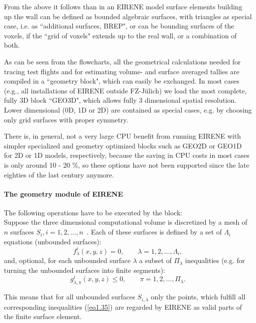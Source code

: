 From the above it follows than in an EIRENE model
surface elements building up the wall can be defined as bounded algebraic surfaces, with triangles as special case,
i.e. as ``additional surfaces, BREP", or can be bounding surfaces of the voxels, if the ``grid of voxels" extends up to the real wall, or a combination of both.

\medskip
As can be seen from the flowcharts, all the geometrical
calculations needed for tracing test flights and for estimating
volume- and surface averaged tallies are compiled in a ``geometry
block", which can easily be exchanged.
In most cases (e.g., all
installations of EIRENE outside FZ-J\"ulich) we load the most
complete, fully 3D block ``GEO3D", which allows fully 3 dimensional spatial
resolution. Lower dimensional (0D, 1D or 2D) are contained as special cases, e.g.
by choosing only grid surfaces with proper symmetry.


There is, in general, not a very large CPU benefit from
running EIRENE with simpler specialized and geometry optimized blocks such as GEO2D or GEO1D for 2D
or 1D models, respectively, because the saving in CPU costs in most
cases is only around 10 - 20 \%, so these options have not been supported since the late eighties of the last century anymore.

\paragraph{The geometry module of EIRENE\\}

The following operations have to be executed by the block:
\\Suppose the three dimensional
computational volume is discretized by a mesh of $n$ surfaces
\mbox{$S_i, i=1,2,...,n$ .} Each of these surfaces is defined by a
set of $\Lambda_i$ equations (unbounded surfaces):
\begin{equation}
f_{\lambda}^i (x,y,z)   =   0 { },    \quad \quad \lambda   =
1,2,..., \Lambda_i { }, \label{eq1.34}
\end{equation}
and, optional, for each unbounded surface $\lambda$  a subset of $ \Pi_{\lambda} $
inequalities (e.g. for turning the unbounded surfaces into finite segments):
\begin{equation}
g_{\lambda , \pi }^i (x,y,z)  \le   0 { },    \quad \quad \pi   =
1,2,..., \Pi_{\lambda} { }. \label{eq1.35}
\end{equation}

This means that for all unbounded surfaces $S_{i,\lambda}$ only the points, which fulfill all corresponding
inequalities (\ref{eq1.35}) are regarded by EIRENE as valid parts of the finite surface element.

